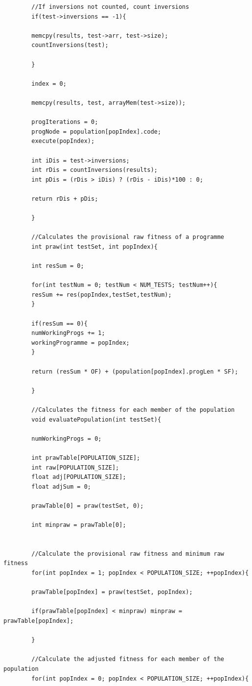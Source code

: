 \documentclass{article}
\begin{document}
\begin{lstlisting}
	    //If inversions not counted, count inversions
	    if(test->inversions == -1){
	    
	    memcpy(results, test->arr, test->size);
	    countInversions(test);
	    
	    }
	    
	    index = 0;
	    
	    memcpy(results, test, arrayMem(test->size));
	    
	    progIterations = 0;
	    progNode = population[popIndex].code;
	    execute(popIndex);
	    
	    int iDis = test->inversions;
	    int rDis = countInversions(results);
	    int pDis = (rDis > iDis) ? (rDis - iDis)*100 : 0;
	    
	    return rDis + pDis; 
	    
	    }
	    
	    //Calculates the provisional raw fitness of a programme
	    int praw(int testSet, int popIndex){
	    
	    int resSum = 0;
	    
	    for(int testNum = 0; testNum < NUM_TESTS; testNum++){
	    resSum += res(popIndex,testSet,testNum);
	    }
	    
	    if(resSum == 0){
	    numWorkingProgs += 1;
	    workingProgramme = popIndex;
	    }
	    
	    return (resSum * OF) + (population[popIndex].progLen * SF);
	    
	    }
	    
	    //Calculates the fitness for each member of the population
	    void evaluatePopulation(int testSet){
	    
	    numWorkingProgs = 0;
	    
	    int prawTable[POPULATION_SIZE];
	    int raw[POPULATION_SIZE];
	    float adj[POPULATION_SIZE];
	    float adjSum = 0;
	    
	    prawTable[0] = praw(testSet, 0);
	    
	    int minpraw = prawTable[0];
	    
	    
	    //Calculate the provisional raw fitness and minimum raw fitness 
	    for(int popIndex = 1; popIndex < POPULATION_SIZE; ++popIndex){
	    
	    prawTable[popIndex] = praw(testSet, popIndex);
	    
	    if(prawTable[popIndex] < minpraw) minpraw = prawTable[popIndex];
	    
	    }
	    
	    //Calculate the adjusted fitness for each member of the population
	    for(int popIndex = 0; popIndex < POPULATION_SIZE; ++popIndex){
	    

\end{lstlisting}
\end{document}
